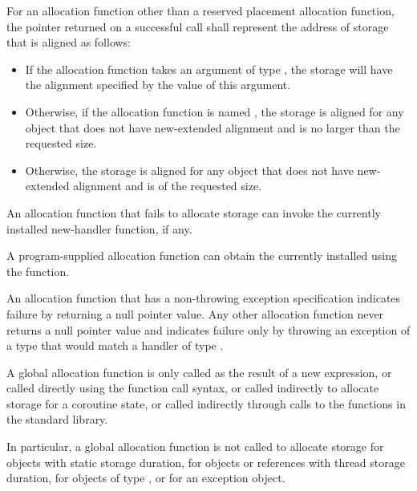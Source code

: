 \pnum
For an allocation function other than
a reserved placement allocation function,
the pointer returned on a successful call
shall represent the address of storage that is aligned as follows:
\begin{itemize}
\item
  If the allocation function takes an argument
  of type ,
  the storage will have the alignment specified
  by the value of this argument.
\item
  Otherwise, if the allocation function is named ,
  the storage is aligned for any object that
  does not have new-extended alignment and
  is no larger than the requested size.
\item
  Otherwise, the storage is aligned for any object that
  does not have new-extended alignment and is of the requested size.
\end{itemize}

\pnum
An allocation function that fails to allocate storage can invoke the
currently installed new-handler function, if any.
\begin{note}
%
A program-supplied allocation function can obtain the
currently installed  using the
 function.
\end{note}
An allocation function that has a non-throwing
exception specification
indicates failure by returning
a null pointer value.
Any other allocation function
never returns a null pointer value and
indicates failure only by throwing an exception of a type
that would match a handler of type
.

\pnum
A global allocation function is only called as the result of a new
expression, or called directly using the function call
syntax, or called indirectly to allocate storage for
a coroutine state,
or called indirectly through calls to the
functions in the \Cpp{} standard library.
\begin{note}
In particular, a
global allocation function is not called to allocate storage for objects
with static storage duration, for objects or references
with thread storage duration, for objects of
type , or for an
exception object.
\end{note}

